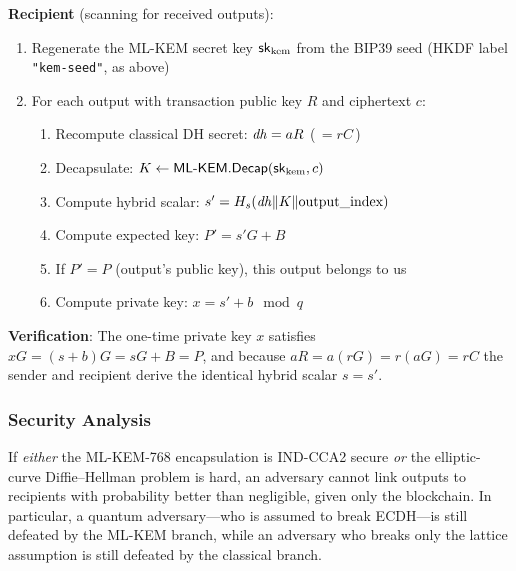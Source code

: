 \textbf{Recipient} (scanning for received outputs):
\begin{enumerate}
  \item Regenerate the ML-KEM secret key $\mathsf{sk}_{\text{kem}}$ from the BIP39
    seed (HKDF label \texttt{"kem-seed"}, as above)
  \item For each output with transaction public key $R$ and ciphertext $c$:
    \begin{enumerate}
      \item Recompute classical DH secret: $\mathit{dh} = aR$ (\,$= rC$\,)
      \item Decapsulate: $K \leftarrow \textsf{ML-KEM}.\mathsf{Decap}(\mathsf{sk}_{\text{kem}}, c)$
      \item Compute hybrid scalar: $s' = H_s(\mathit{dh} \| K \| \text{output\_index})$
      \item Compute expected key: $P' = s'G + B$
      \item If $P' = P$ (output's public key), this output belongs to us
      \item Compute private key: $x = s' + b \mod q$
    \end{enumerate}
\end{enumerate}

\textbf{Verification}: The one-time private key $x$ satisfies
$xG = (s + b)G = sG + B = P$, and because $aR = a(rG) = r(aG) = rC$ the sender
and recipient derive the identical hybrid scalar $s = s'$.

\subsubsection{Security Analysis}

\begin{theorem}
If \emph{either} the ML-KEM-768 encapsulation is IND-CCA2 secure \emph{or} the
elliptic-curve Diffie--Hellman problem is hard, an adversary cannot link
outputs to recipients with probability better than negligible, given only the
blockchain. In particular, a quantum adversary---who is assumed to break
ECDH---is still defeated by the ML-KEM branch, while an adversary who breaks
only the lattice assumption is still defeated by the classical branch.
\end{theorem}

